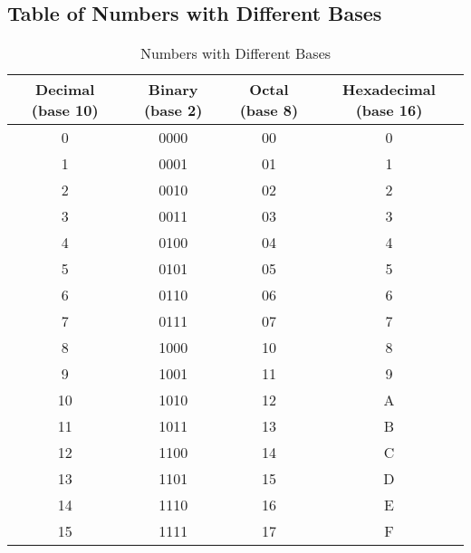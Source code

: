 \documentclass{article}
\begin{document}
	\subsection*{Table of Numbers with Different Bases}
	\begin{table}[h!]
		\centering
		\begin{tabular}{cccc}
			\toprule
			\textbf{Decimal (base 10)} & \textbf{Binary (base 2)} & \textbf{Octal (base 8)} & \textbf{Hexadecimal (base 16)} \\
			\midrule
			0 & 0000 & 00 & 0 \\
			1 & 0001 & 01 & 1 \\
			2 & 0010 & 02 & 2 \\
			3 & 0011 & 03 & 3 \\
			4 & 0100 & 04 & 4 \\
			5 & 0101 & 05 & 5 \\
			6 & 0110 & 06 & 6 \\
			7 & 0111 & 07 & 7 \\
			8 & 1000 & 10 & 8 \\
			9 & 1001 & 11 & 9 \\
			10 & 1010 & 12 & A \\
			11 & 1011 & 13 & B \\
			12 & 1100 & 14 & C \\
			13 & 1101 & 15 & D \\
			14 & 1110 & 16 & E \\
			15 & 1111 & 17 & F \\
			\bottomrule
		\end{tabular}
		\caption{Numbers with Different Bases}
	\end{table}
	
\end{document}
